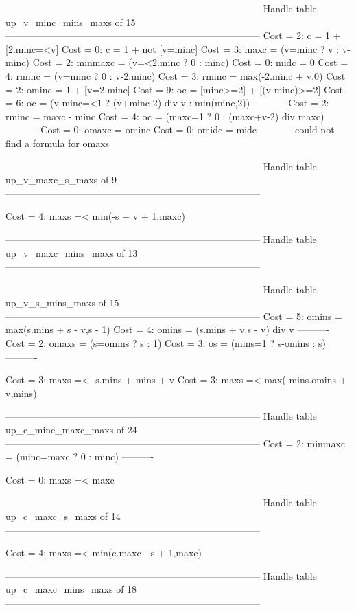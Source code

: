 --------------------------------------------------------------------------------
Handle table up_v_minc_mins_maxs of 15
--------------------------------------------------------------------------------
Cost =  2:  c       = 1 + [2.minc=<v]
Cost =  0:  c       = 1 + not [v=minc]
Cost =  3:  maxc    = (v=minc ? v : v-minc)
Cost =  2:  minmaxc = (v=<2.minc ? 0 : minc)
Cost =  0:  midc    = 0
Cost =  4:  rminc   = (v=minc ? 0 : v-2.minc)
Cost =  3:  rminc   = max(-2.minc + v,0)
Cost =  2:  ominc   = 1 + [v=2.minc]
Cost =  9:  oc      = [minc>=2] + [(v-minc)>=2]
Cost =  6:  oc      = (v-minc=<1 ? (v+minc-2) div v : min(minc,2))
----------
Cost =  2:  rminc   = maxc - minc
Cost =  4:  oc      = (maxc=1 ? 0 : (maxc+v-2) div maxc)
----------
Cost =  0:  omaxc   = ominc
Cost =  0:  omidc   = midc
----------
could not find a formula for omaxs


--------------------------------------------------------------------------------
Handle table up_v_maxc_s_maxs of 9
--------------------------------------------------------------------------------

Cost =  4:  maxs =< min(-s + v + 1,maxc)

--------------------------------------------------------------------------------
Handle table up_v_maxc_mins_maxs of 13
--------------------------------------------------------------------------------


--------------------------------------------------------------------------------
Handle table up_v_s_mins_maxs of 15
--------------------------------------------------------------------------------
Cost =  5:  omins = max(s.mins + s - v,s - 1)
Cost =  4:  omins = (s.mins + v.s - v) div v
----------
Cost =  2:  omaxs = (s=omins ? s : 1)
Cost =  3:  os    = (mins=1 ? s-omins : s)
----------

Cost =  3:  maxs =< -s.mins + mins + v
Cost =  3:  maxs =< max(-mins.omins + v,mins)

--------------------------------------------------------------------------------
Handle table up_c_minc_maxc_maxs of 24
--------------------------------------------------------------------------------
Cost =  2:  minmaxc = (minc=maxc ? 0 : minc)
----------

Cost =  0:  maxs =< maxc

--------------------------------------------------------------------------------
Handle table up_c_maxc_s_maxs of 14
--------------------------------------------------------------------------------

Cost =  4:  maxs =< min(c.maxc - s + 1,maxc)

--------------------------------------------------------------------------------
Handle table up_c_maxc_mins_maxs of 18
--------------------------------------------------------------------------------
